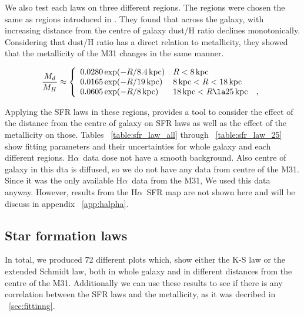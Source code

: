 \documentclass[useAMS,usenatbib]{mn2e}
\newcommand \kpc        {\,{\rm kpc}}
\newcommand \halpha    {H$\alpha $\ }
\begin{document}
We also test each laws on three different regions. The regions were chosen the same as regions introduced in \cite{Drain14}. They found that across the galaxy, with increasing distance from the centre of galaxy dust/H ratio declines monotonically. Considering that dust/H ratio has a direct relation to metallicity, they showed that the metallicity of the M31 changes in the same manner.

\begin{equation}
\label{eq:dust2gas_vs_R}
\frac{M_d}{M_H} \approx
\left\{ \begin{array}{l l}
0.0280 \exp(-R/8.4\kpc)  & R< 8\kpc\\
0.0165 \exp(-R/19\kpc)   & 8\kpc < R < 18\kpc\\
0.0605 \exp(-R/8\kpc)    & 18\kpc < R \la 25\kpc ~~~,\\
\end{array}
\right.
\end{equation}

Applying the SFR laws in these regions, provides a tool to consider the effect of the distance from the centre of galaxy on SFR laws as well as the effect of the metallicity on those. Tables ~\ref{table:sfr_law_all} through ~\ref{table:sfr_law_25} show fitting parameters and their uncertainties for whole galaxy and each different regions. \halpha data dose not have a smooth background. Also centre of galaxy in this dta is diffused, so we do not have any data from centre of the M31. Since it was the only available \halpha data from the M31, We used this data anyway. However, results from the \halpha SFR map are not shown here and will be discuss in appendix ~\ref{app:halpha}. %

\subsection{Star formation laws}
In total, we produced 72 different plots which, show either the K-S law or the extended Schmidt law, both in whole galaxy and in different distances from the centre of the M31. Additionally we can use these results to see if there is any correlation  between the SFR laws and the metallicity, as it was decribed in ~\ref{sec:fittinng}.
  
\end{document}
